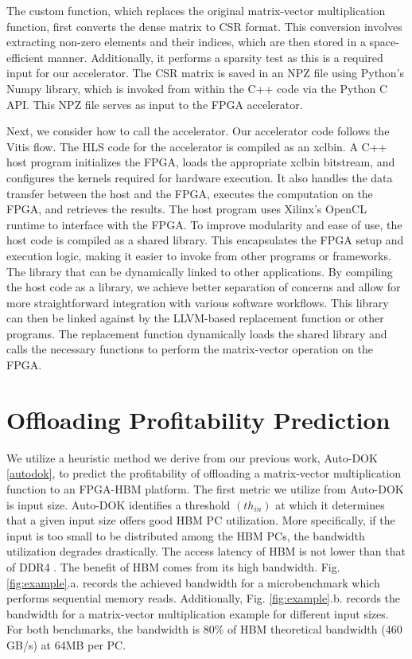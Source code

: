 \documentclass[manuscript,screen,review]{acmart}
\begin{document}
The custom function, which replaces the original matrix-vector multiplication function, first converts the dense matrix to CSR format. This conversion involves extracting non-zero elements and their indices, which are then stored in a space-efficient manner. Additionally, it performs a sparsity test as this is a required input for our accelerator. The CSR matrix is saved in an NPZ file using Python’s Numpy library, which is invoked from within the C++ code via the Python C API. This NPZ file serves as input to the FPGA accelerator.

Next, we consider how to call the accelerator. Our accelerator code follows the Vitis flow. The HLS code for the accelerator is compiled as an xclbin. A C++ host program initializes the FPGA, loads the appropriate xclbin bitstream, and configures the kernels required for hardware execution. It also handles the data transfer between the host and the FPGA, executes the computation on the FPGA, and retrieves the results. The host program uses Xilinx's OpenCL runtime to interface with the FPGA. To improve modularity and ease of use, the host code is compiled as a shared library. This encapsulates the FPGA setup and execution logic, making it easier to invoke from other programs or frameworks. The library that can be dynamically linked to other applications. By compiling the host code as a library, we achieve better separation of concerns and allow for more straightforward integration with various software workflows. This library can then be linked against by the LLVM-based replacement function or other programs. The replacement function dynamically loads the shared library and calls the necessary functions to perform the matrix-vector  operation on the FPGA.



\section{Offloading Profitability Prediction}
\label{offloading-profitability}
We utilize a heuristic method we derive from our previous work, Auto-DOK \ref{autodok}, to predict the profitability of offloading a matrix-vector multiplication function to an FPGA-HBM platform. The first metric we utilize from Auto-DOK is input size. Auto-DOK identifies a threshold $(th_{in})$ at which it determines that a given input size offers good HBM PC utilization. More specifically, if the input is too small to be distributed among the HBM PCs, the bandwidth utilization degrades drastically. The access latency of HBM is not lower than that of DDR4 \cite{Shuhai,9460576}. The benefit of HBM comes from its high bandwidth. Fig. \ref{fig:example}.a. records the achieved bandwidth for a microbenchmark which performs sequential memory reads. Additionally, Fig. \ref{fig:example}.b. records the bandwidth for a matrix-vector multiplication example for different input sizes. For both benchmarks, the bandwidth is 80\% of HBM theoretical bandwidth (460 GB/s) at 64MB per PC.
\end{document}
